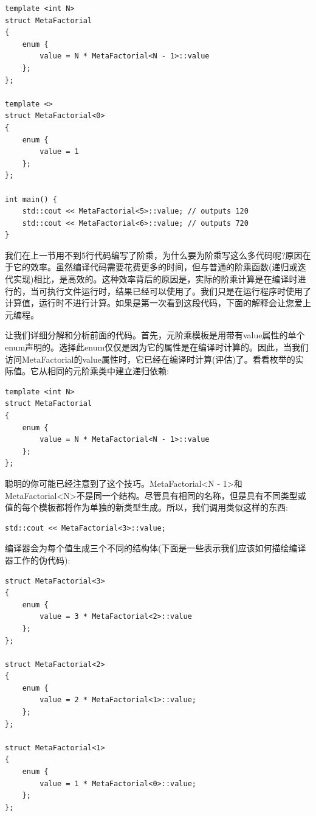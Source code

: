 \begin{lstlisting}[caption={}]
template <int N>
struct MetaFactorial
{
	enum {
		value = N * MetaFactorial<N - 1>::value
	};
};

template <>
struct MetaFactorial<0>
{
	enum {
		value = 1
	};
};

int main() {
	std::cout << MetaFactorial<5>::value; // outputs 120
	std::cout << MetaFactorial<6>::value; // outputs 720
}
\end{lstlisting}

我们在上一节用不到5行代码编写了阶乘，为什么要为阶乘写这么多代码呢?原因在于它的效率。虽然编译代码需要花费更多的时间，但与普通的阶乘函数(递归或迭代实现)相比，是高效的。这种效率背后的原因是，实际的阶乘计算是在编译时进行的，当可执行文件运行时，结果已经可以使用了。我们只是在运行程序时使用了计算值，运行时不进行计算。如果是第一次看到这段代码，下面的解释会让您爱上元编程。 \par
让我们详细分解和分析前面的代码。首先，元阶乘模板是用带有value属性的单个enum声明的。选择此enum仅仅是因为它的属性是在编译时计算的。因此，当我们访问MetaFactorial的value属性时，它已经在编译时计算(评估)了。看看枚举的实际值。它从相同的元阶乘类中建立递归依赖: \par

\begin{lstlisting}[caption={}]
template <int N>
struct MetaFactorial
{
	enum {
		value = N * MetaFactorial<N - 1>::value
	};
};
\end{lstlisting}

聪明的你可能已经注意到了这个技巧。MetaFactorial<N - 1>和MetaFactorial<N>不是同一个结构。尽管具有相同的名称，但是具有不同类型或值的每个模板都将作为单独的新类型生成。所以，我们调用类似这样的东西: \par

\begin{lstlisting}[caption={}]
std::cout << MetaFactorial<3>::value;
\end{lstlisting}

编译器会为每个值生成三个不同的结构体(下面是一些表示我们应该如何描绘编译器工作的伪代码): \par

\begin{lstlisting}[caption={}]
struct MetaFactorial<3>
{
	enum {
		value = 3 * MetaFactorial<2>::value
	};
};

struct MetaFactorial<2>
{
	enum {
		value = 2 * MetaFactorial<1>::value;
	};
};

struct MetaFactorial<1>
{
	enum {
		value = 1 * MetaFactorial<0>::value;
	};
};
\end{lstlisting}

